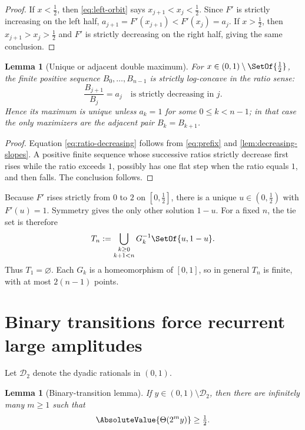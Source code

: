 \documentclass[11pt,oneside]{article}
\newtheorem{lemma}[theorem]{Lemma}
\theoremstyle{definition}
\theoremstyle{remark}
\newcommand{\D}{\mathcal{D}}
\newcommand{\ThetaF}{\Theta}
\newcommand{\half}{\tfrac12}
\begin{document}
\begin{proof}
If $x<\half$, then \eqref{eq:left-orbit} says $x_{j+1}<x_j<\half$.  Since $F'$ is
strictly increasing on the left half, $a_{j+1}=F'(x_{j+1})<F'(x_j)=a_j$.
If $x>\half$, then $x_{j+1}>x_j>\half$ and $F'$ is strictly decreasing on the right
half, giving the same conclusion.
\end{proof}

\begin{lemma}[Unique or adjacent double maximum]
\label{lem:prefix-unimodal}
For $x\in(0,1)\setminus\SetOf{\half}$, the finite positive sequence
$B_0,\ldots,B_{n-1}$ is strictly log-concave in the ratio sense:
\begin{equation}
 \frac{B_{j+1}}{B_j}=a_j
 \quad\text{is strictly decreasing in }j.
 \label{eq:ratio-decreasing}
\end{equation}
Hence its maximum is unique unless $a_k=1$ for some $0\leq k<n-1$; in that case the
only maximizers are the adjacent pair $B_k=B_{k+1}$.
\end{lemma}

\begin{proof}
Equation \eqref{eq:ratio-decreasing} follows from \eqref{eq:prefix} and
\cref{lem:decreasing-slopes}.  A positive finite sequence whose successive ratios
strictly decrease first rises while the ratio exceeds $1$, possibly has one flat step
when the ratio equals $1$, and then falls.  The conclusion follows.
\end{proof}

Because $F'$ rises strictly from $0$ to $2$ on $[0,\half]$, there is a unique
$u\in(0,\half)$ with $F'(u)=1$.  Symmetry gives the only other solution $1-u$.
For a fixed $n$, the tie set is therefore
\begin{equation}
 T_n:=\bigcup_{\substack{k\geq0\\k+1<n}}G_k^{-1}\SetOf{u,1-u}.
\label{eq:tie-set}
\end{equation}
Thus $T_1=\varnothing$.  Each $G_k$ is a homeomorphism of $[0,1]$, so in
general $T_n$ is finite, with at most $2(n-1)$ points.

\section{Binary transitions force recurrent large amplitudes}
\label{sec:binary}

Let $\D_2$ denote the dyadic rationals in $(0,1)$.

\begin{lemma}[Binary-transition lemma]
\label{lem:binary-transition}
If $y\in(0,1)\setminus\D_2$, then there are infinitely many $m\geq1$ such that
\begin{equation}
 \AbsoluteValue{\ThetaF(2^m y)}\geq\half.
 \label{eq:theta-recurrence}
\end{equation}
\end{lemma}
\end{document}
